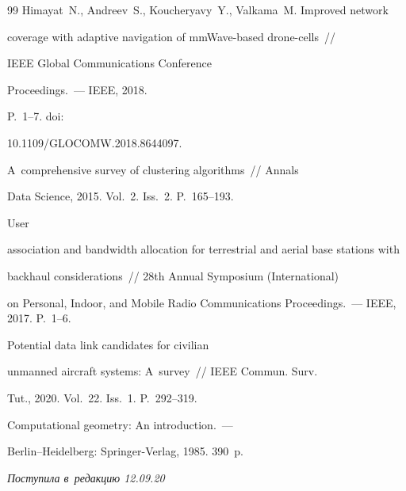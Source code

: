 {{\begin{thebibliography}{99}
{Himayat~N., Andreev~S., Koucheryavy~Y., Valkama~M.} Improved network 


coverage with adaptive navigation of mmWave-based drone-cells~/\!\!/ 


IEEE Global Communications Conference 


Proceedings.~---  IEEE, 2018. 


P.~1--7. doi: 


10.1109/GLOCOMW.2018.8644097.




 A~comprehensive survey of clustering algorithms~/\!\!/ Annals 


Data Science, 2015. Vol.~2. Iss.~2. P.~165--193. 




 User 


association and bandwidth allocation for terrestrial and aerial base stations with 


backhaul considerations~/\!\!/ 28th Annual Symposium (International) 


on Personal, Indoor, and Mobile Radio Communications Proceedings.~--- IEEE, 2017. P.~1--6. 




 Potential data link candidates for civilian 


unmanned aircraft systems: A~survey~/\!\!/ IEEE Commun. Surv. 


Tut., 2020. Vol.~22. Iss.~1. P.~292--319.




 Computational geometry: An introduction.~--- 


Berlin--Heidelberg: Springer-Verlag, 1985. 390~p.


\end{thebibliography}


} }








\vspace*{-3pt}





\hfill{\small\textit{Поступила в~редакцию 12.09.20}}














